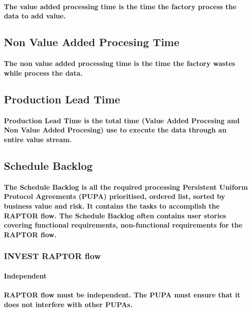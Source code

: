 \documentclass{acm_proc_article-sp}
\begin{document}
\paragraph{The value added processing time is the time the factory process the data to add value.}
\subsection{Non Value Added Procesing Time}
\paragraph{The non value added processing time is the time the factory wastes while process the data.}
\subsection{Production Lead Time}
\paragraph{Production Lead Time is the total time (Value Added Procesing and Non Value Added Procesing) use to execute the data through an entire value stream.}
\subsection{Schedule Backlog}
\paragraph{The Schedule Backlog is all the required processing Persistent Uniform Protocol Agreements (PUPA) prioritised, ordered list, sorted by business value and risk. It contains the tasks to accomplish the RAPTOR flow. The Schedule Backlog often contains user stories covering functional requirements, non-functional requirements for the RAPTOR flow.}
\subsubsection{INVEST RAPTOR flow}
\paragraph{\textbf{Independent}}
\paragraph{RAPTOR flow must be independent. The PUPA must ensure that it does not interfere with other PUPAs.}
\end{document}
